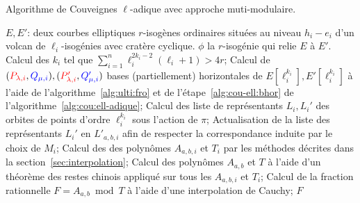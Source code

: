 \documentclass[10pt,a4paper]{book}
\theoremstyle{plain}
\theoremstyle{definition}
\theoremstyle{definition}
\theoremstyle{definition}
\theoremstyle{definition}
\theoremstyle{remark}
\theoremstyle{remark}
\theoremstyle{definition}
\begin{document}
\begin{algorithm}
\caption{\label{alg:cou:mult-adique:short} Algorithme de Couveignes $\ell$-adique avec approche muti-modulaire.}
\begin{algorithmic}[1]
\REQUIRE $E,E'$: deux courbes elliptiques $r$-isogènes ordinaires situées au niveau $h_i-e_i$ d'un volcan de $\ell_i$-isogénies avec cratère cyclique.
\ENSURE $\phi$ la $r$-isogénie qui relie $E$ à $E'$.
\STATE Calcul des $k_i$ tel que $\sum_{i=1}^n\ell_{i}^{2k_{i}-2}(\ell_{i}+1)>4r$;
\STATE \label{alg:mult-ell:bhor} Calcul de $(\color{red}P_{\lambda,i}\color{black},\color{blue}Q_{\mu,i}\color{black}),(\color{red}P'_{\lambda,i}\color{black},\color{blue}Q_{\mu,i}'\color{black})$ bases (partiellement) horizontales de $E[\ell_i^{k_i}],E'[\ell_i^{k_i}]$ à l'aide de l'algorithme~\ref{alg:ulti:fro} et de l'étape~\ref{alg:cou-ell:bhor} de l'algorithme~\ref{alg:cou:ell-adique};
\STATE \label{alg:mult-ell:rep} Calcul des liste de représentants $L_i,L_i'$ des orbites de points d'ordre $\ell_i^{k_i}$ sous l'action de $\pi$;
\ENDFOR
{}
\STATE \label{alg:mult-ell:ord} Actualisation de la liste des représentants $L_i'$ en $L'_{a,b,i}$ afin de respecter la correspondance induite par le choix de $M_i$;
\STATE \label{alg:mult-ell:int} Calcul des des polynômes $A_{a,b,i}$ et $T_i$ par les méthodes décrites dans la section~\ref{sec:interpolation};
\ENDFOR
\STATE Calcul des polynômes $A_{a,b}$ et $T$ à l'aide d'un théorème des restes chinois appliqué sur tous les $A_{a,b,i}$ et $T_i$;
\STATE \label{alg:mult-ell:Cauchy} Calcul de la fraction rationnelle $F=A_{a,b} \bmod T$ à l'aide d'une interpolation de Cauchy;
\RETURN $F$
\ENDIF
\ENDFOR 
\end{algorithmic}
\end{algorithm}
\end{document}
